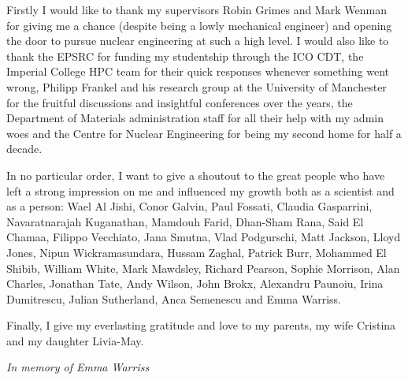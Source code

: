 \cleardoublepage


\begin{acknowledgements}

Firstly I would like to thank my supervisors Robin Grimes and Mark Wenman for giving me a chance (despite being a lowly mechanical engineer) and opening the door to pursue nuclear engineering at such a high level. I would also like to thank the EPSRC for funding my studentship through the ICO CDT, the Imperial College HPC team for their quick responses whenever something went wrong, Philipp Frankel and his research group at the University of Manchester for the fruitful discussions and insightful conferences over the years, the Department of Materials administration staff for all their help with my admin woes and the Centre for Nuclear Engineering for being my second home for half a decade.

In no particular order, I want to give a shoutout to the great people who have left a strong impression on me and influenced my growth both as a scientist and as a person: Wael Al Jishi, Conor Galvin, Paul Fossati, Claudia Gasparrini, Navaratnarajah Kuganathan, Mamdouh Farid, Dhan-Sham Rana, Said El Chamaa, Filippo Vecchiato, Jana Smutna, Vlad Podgurschi, Matt Jackson, Lloyd Jones, Nipun Wickramasundara, Hussam Zaghal, Patrick Burr, Mohammed El Shibib, William White, Mark Mawdsley, Richard Pearson, Sophie Morrison, Alan Charles, Jonathan Tate, Andy Wilson, John Brokx, Alexandru Paunoiu, Irina Dumitrescu, Julian Sutherland, Anca Semenescu and Emma Warriss.

Finally, I give my everlasting gratitude and love to my parents, my wife Cristina and my daughter Livia-May.

\clearpage


\begin{center}
\bigskip
\emph{In memory of Emma Warriss}
\end{center}

\end{acknowledgements}